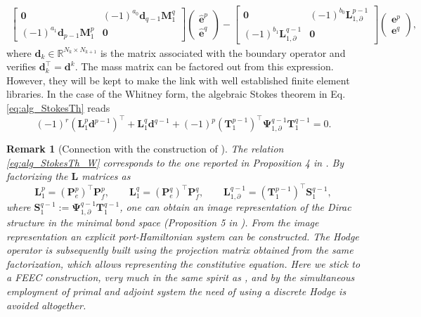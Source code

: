 \documentclass{elsarticle}
\newtheorem{remark}{Remark}
\newcommand*{\dual}[1]{\ensuremath{\widehat{#1}}}
\begin{document}
\begin{equation}
\begin{aligned}
    \begin{bmatrix}
        \mathbf{0} & (-1)^{a_0}\mathbf{d}_{q-1}\mathbf{M}^q_1\\
        (-1)^{a_1}\mathbf{d}_{p-1}\mathbf{M}^p_1 & \mathbf{0}
    \end{bmatrix}
    \begin{pmatrix}
    \dual{\mathbf{e}}^p \\
    \dual{\mathbf{e}}^q
    \end{pmatrix} -
    \begin{bmatrix}
        \mathbf{0} & (-1)^{b_0}\mathbf{L}_{1, \partial}^{p-1} \\
        (-1)^{b_1}\mathbf{L}^{q-1}_{1, \partial} & \mathbf{0}
    \end{bmatrix}
    \begin{pmatrix}
    {\mathbf{e}}^p \\
    {\mathbf{e}}^q
    \end{pmatrix},
\end{aligned}
\end{equation}
where $\mathbf{d}_{k} \in \mathbb{R}^{N_k \times N_{k+1}}$ is the matrix associated with the boundary operator and verifies $\mathbf{d}_{k}^\top = \mathbf{d}^{k}$. The mass matrix can be factored out from this expression. However, they will be kept to make the link with well established finite element libraries. 
In the case of the Whitney form, the algebraic Stokes theorem in Eq. \eqref{eq:alg_StokesTh} reads
\begin{equation}\label{eq:alg_StokesTh_W}
    (-1)^{r}(\mathbf{L}^{p}_1 \mathbf{d}^{p-1})^\top + \mathbf{L}^q_1 \mathbf{d}^{q-1} + (-1)^p (\mathbf{T}^{p-1}_1)^\top \mathbf{\Psi}^{q-1}_{1, \partial} \mathbf{T}^{q-1}_1 = 0.
\end{equation}

\begin{remark}[Connection with the construction of \cite{kotyczka2018weak}]
The relation \eqref{eq:alg_StokesTh_W} corresponds to the one reported in Proposition 4 in \cite{kotyczka2018weak}. By factorizing the $\mathbf{L}$ matrices as 
$$\mathbf{L}^p_1 = (\mathbf{P}_e^p)^\top \mathbf{P}_f^p, \qquad  \mathbf{L}^q_1 = (\mathbf{P}_e^q)^\top \mathbf{P}_f^q, \qquad  \mathbf{L}^{q-1}_{1, \partial} = (\mathbf{T}^{p-1}_1)^\top \mathbf{S}^{q-1}_1, $$ 
where $\mathbf{S}^{q-1}_1:=\mathbf{\Psi}^{q-1}_{1, \partial} \mathbf{T}^{q-1}_1$, one can obtain an image representation of the Dirac structure in the minimal bond space (Proposition 5 in \cite{kotyczka2018weak}). From the image representation an explicit port-Hamiltonian system can be constructed. The Hodge operator is subsequently built using the projection matrix obtained from the same factorization, which allows representing the constitutive equation. Here we stick to a FEEC construction, very much in the same spirit as \cite{cardoso2020pfem}, and by the simultaneous employment of primal and adjoint system the need of using a discrete Hodge is avoided altogether.
\end{remark}
\end{document}
